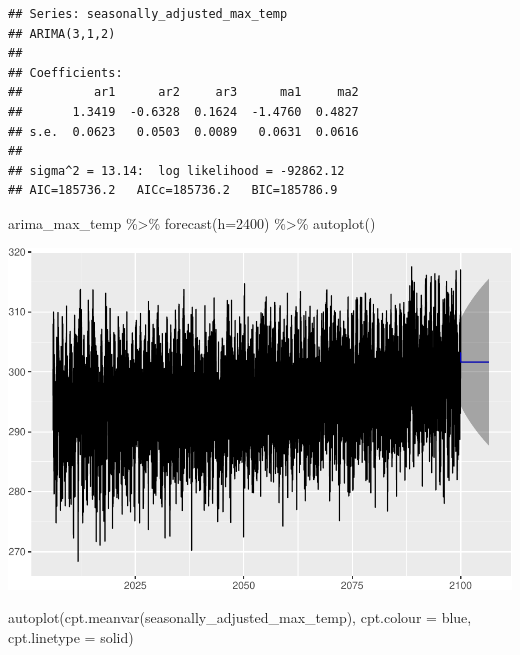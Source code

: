 \documentclass[
  paper=a4,
  ,captions=tableheading
]{scrartcl}
\newenvironment{Shaded}{\begin{snugshade}}{\end{snugshade}}
\newcommand{\AttributeTok}[1]{\textcolor[rgb]{0.77,0.63,0.00}{#1}}
\newcommand{\DecValTok}[1]{\textcolor[rgb]{0.00,0.00,0.81}{#1}}
\newcommand{\FunctionTok}[1]{\textcolor[rgb]{0.00,0.00,0.00}{#1}}
\newcommand{\NormalTok}[1]{#1}
\newcommand{\SpecialCharTok}[1]{\textcolor[rgb]{0.00,0.00,0.00}{#1}}
\newcommand{\StringTok}[1]{\textcolor[rgb]{0.31,0.60,0.02}{#1}}
\begin{document}
\begin{verbatim}
## Series: seasonally_adjusted_max_temp 
## ARIMA(3,1,2) 
## 
## Coefficients:
##          ar1      ar2     ar3      ma1     ma2
##       1.3419  -0.6328  0.1624  -1.4760  0.4827
## s.e.  0.0623   0.0503  0.0089   0.0631  0.0616
## 
## sigma^2 = 13.14:  log likelihood = -92862.12
## AIC=185736.2   AICc=185736.2   BIC=185786.9
\end{verbatim}

\begin{Shaded}
\begin{Highlighting}[]
\NormalTok{arima\_max\_temp }\SpecialCharTok{\%\textgreater{}\%} \FunctionTok{forecast}\NormalTok{(}\AttributeTok{h=}\DecValTok{2400}\NormalTok{) }\SpecialCharTok{\%\textgreater{}\%} \FunctionTok{autoplot}\NormalTok{()}
\end{Highlighting}
\end{Shaded}

\includegraphics{Haskell_files/figure-latex/unnamed-chunk-71-1.pdf}

\begin{Shaded}
\begin{Highlighting}[]
\FunctionTok{autoplot}\NormalTok{(}\FunctionTok{cpt.meanvar}\NormalTok{(seasonally\_adjusted\_max\_temp), }\AttributeTok{cpt.colour =} \StringTok{\textquotesingle{}blue\textquotesingle{}}\NormalTok{, }\AttributeTok{cpt.linetype =} \StringTok{\textquotesingle{}solid\textquotesingle{}}\NormalTok{)}
\end{Highlighting}
\end{Shaded}
\end{document}
